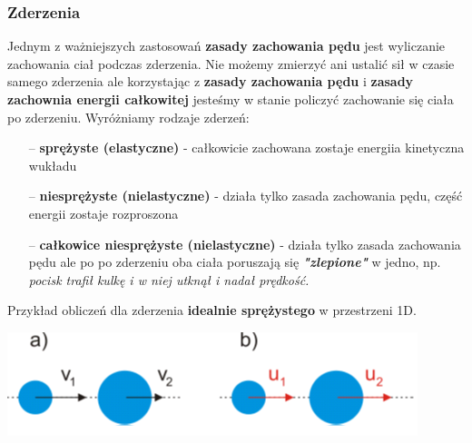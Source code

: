 \documentclass[a4paper]{article}
\begin{document}
    \subsubsection*{\Large Zderzenia}
    Jednym z ważniejszych zastosowań \textbf{zasady zachowania pędu} jest wyliczanie zachowania 
    ciał podczas zderzenia. Nie możemy zmierzyć ani ustalić sił w czasie samego zderzenia ale 
    korzystając z \textbf{zasady zachowania pędu} i \textbf{zasady zachownia energii całkowitej}
    jesteśmy w stanie policzyć zachowanie się ciała po zderzeniu.
    Wyróżniamy rodzaje zderzeń:
    \begin{itemize}
        \item[--] \textbf{sprężyste (elastyczne)} - całkowicie zachowana zostaje energiia kinetyczna wukładu
        \item[--] \textbf{niesprężyste (nielastyczne)} - działa tylko zasada zachowania pędu, część energii 
        zostaje rozproszona
        \item[--] \textbf{całkowice niesprężyste (nielastyczne)} - działa tylko zasada zachowania pędu ale po 
        po zderzeniu oba ciała poruszają się \textbf{\em{"zlepione"}} w jedno, np. \em{pocisk trafił kulkę i w niej
        utknął i nadał prędkość.}
    \end{itemize}
    Przykład obliczeń dla zderzenia \textbf{idealnie sprężystego} w przestrzeni 1D.
    \begin{center}
        \includegraphics{img/zderzenie.png}
    \end{center}
\end{document}
